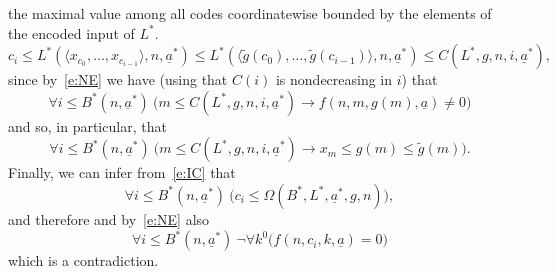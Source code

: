 \documentclass[1p]{elsarticle}
\theoremstyle{plain}
\theoremstyle{definition}
\theoremstyle{remark}
\renewenvironment{proof}[1][]{\noindent{\bf Proof{#1}. }}{\nopagebreak[4]{\hspace*{\fill}
  $\Box$              %
 }{\vspace{2ex}}}
\theoremstyle{definition}
\begin{document}
{\begin{proof}
{the maximal value among all codes coordinatewise bounded by the elements of the encoded input of $L^*$.}
\[
   c_i\leq L^*(\langle x_{c_0},\ldots,x_{c_{i-1}}\rangle, n,\underline{a}^*)
   \leq L^*(\langle \tilde g({c_0}),\ldots,\tilde g({c_{i-1}})\rangle, n,\underline{a}^*)\le C(L^*,g,n,i,\underline{a}^*),
\]
since by~\eqref{e:NE} we have (using that $C(i)$ is nondecreasing in $i$) 
that \[ \forall i\leq B^*(n,\underline{a}^*)\ 
\big(m\leq C(L^*,g,n,i,\underline{a}^*)\rightarrow f(n,m,g(m),\underline{a})\neq0 \big)\] and 
so, in particular, that
\[ \forall i\leq B^*(n,\underline{a}^*)\ \big(m\leq C(L^*,g,n,i,\underline{a}^*)
\rightarrow x_m\leq g(m)\leq \tilde g(m) \big). \]
Finally, we can infer from~\eqref{e:IC} that
\[ \forall i\leq B^*(n,\underline{a}^*)\ 
\big(c_i\leq \Omega(B^*,L^*,\underline{a}^*,g,n)\big),\]
and therefore and by~\eqref{e:NE} also
\[ \forall i\leq B^*(n,\underline{a}^*)\ \neg\forall k^0\big( 
f(n,c_i,k,\underline{a})=0\big) \]
which is a contradiction.

\end{proof}

}
\end{document}
